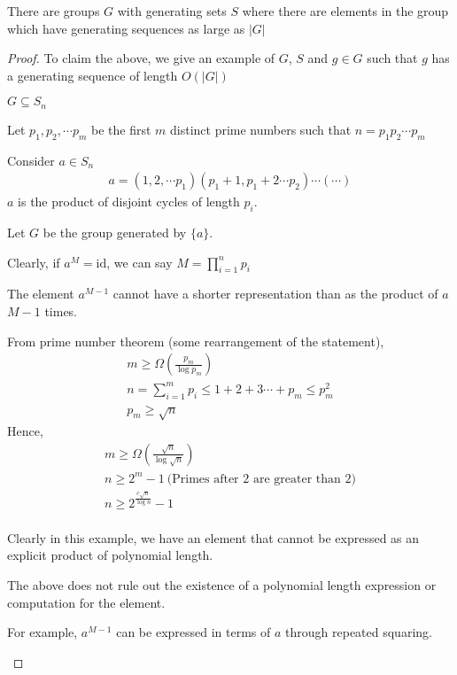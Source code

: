 \begin{proposition}
There are groups $G$ with generating sets $S$ where 
there are elements in the group which have generating
sequences as large as $|G|$ 
\end{proposition}
\begin{proof}

To claim the above, we give an example of $G$, $S$
and $g \in G$ such that $g$ has a generating sequence of 
length $O(|G|)$

$G \subseteq S_n$

Let $p_1, p_2, \cdots p_m$ be the first $m$ distinct prime numbers
such that $n = p_1p_2 \cdots p_m$

Consider $a \in S_n$ 
\begin{align}
a = (1, 2, \cdots p_1) (p_1+1, p_1+2 \cdots p_2) \cdots (\cdots)
\end{align}
$a$ is the product of disjoint cycles of length $p_i$.

Let $G$ be the group generated by $\lbrace a \rbrace$.

Clearly, if $a^M = \text{id}$, we can say $M = \prod\limits_{i=1}^n p_i$

The element $a^{M-1}$ cannot have a shorter representation than 
as the product of $a$ $M-1$ times.

From prime number theorem (some rearrangement of the statement),
\begin{align}
m \geq \Omega(\frac{p_m}{\log p_m}) \\
n = \sum\limits_{i = 1}^m p_i \leq 1 + 2 + 3 \cdots + p_m \leq p_m^2 \\
p_m \geq \sqrt n
\end{align}
Hence, 
\begin{align}
m \geq \Omega(\frac{\sqrt n}{\log \sqrt n}) \\
n \geq 2^m - 1 ~\text{(Primes after $2$ are greater than $2$)} \\ 
n \geq 2^{\frac{c \sqrt n}{\log n }} - 1 \\
\end{align}

Clearly in this example, we have an element that
cannot be expressed as an explicit product of polynomial
length. 

\begin{remark}
The above does not rule out the existence of a polynomial 
length expression or computation for the element. 

For example, $a^{M-1}$ can be expressed in terms of
$a$ through repeated squaring.
\end{remark}
\end{proof}



